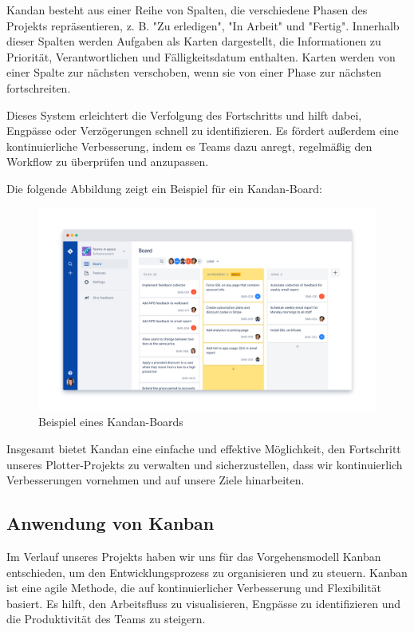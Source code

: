 \documentclass[a4paper]{article}
\begin{document}
Kandan besteht aus einer Reihe von Spalten, die verschiedene Phasen des Projekts repräsentieren, z. B. "Zu erledigen", "In Arbeit" und "Fertig". Innerhalb dieser Spalten werden Aufgaben als Karten dargestellt, die Informationen zu Priorität, Verantwortlichen und Fälligkeitsdatum enthalten. Karten werden von einer Spalte zur nächsten verschoben, wenn sie von einer Phase zur nächsten fortschreiten.

Dieses System erleichtert die Verfolgung des Fortschritts und hilft dabei, Engpässe oder Verzögerungen schnell zu identifizieren. Es fördert außerdem eine kontinuierliche Verbesserung, indem es Teams dazu anregt, regelmäßig den Workflow zu überprüfen und anzupassen.

Die folgende Abbildung zeigt ein Beispiel für ein Kandan-Board:

\begin{figure}[h]
	\centering
	\includegraphics[width=1\textwidth]{Resources/kanban_board_example.png}
	\caption{Beispiel eines Kandan-Boards}
	\label{fig:kanban_board_example}
\end{figure}

Insgesamt bietet Kandan eine einfache und effektive Möglichkeit, den Fortschritt unseres Plotter-Projekts zu verwalten und sicherzustellen, dass wir kontinuierlich Verbesserungen vornehmen und auf unsere Ziele hinarbeiten.

\newpage

\subsection{Anwendung von Kanban}

Im Verlauf unseres Projekts haben wir uns für das Vorgehensmodell Kanban entschieden, um den Entwicklungsprozess zu organisieren und zu steuern. Kanban ist eine agile Methode, die auf kontinuierlicher Verbesserung und Flexibilität basiert. Es hilft, den Arbeitsfluss zu visualisieren, Engpässe zu identifizieren und die Produktivität des Teams zu steigern.
\end{document}
